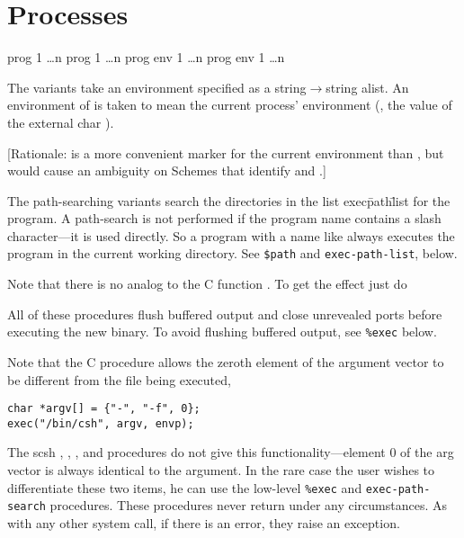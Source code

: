 \section{Processes}

 {prog 1 \ldots {}n} \noreturn
{} {prog 1 \ldots {}n} \noreturn
{}  {prog env 1 \ldots {}n} \noreturn
{} {prog env 1 \ldots {}n} \noreturn
\begin{desc}

The  variants take an environment specified as a 
string$\rightarrow$string alist.
An environment of {\sharpt} is taken to mean the current process' environment 
(\ie, the value of the external char ).

[Rationale: {\sharpf} is a more convenient marker for the current environment
 than {\sharpt}, but would cause an ambiguity on Schemes that identify 
 {\sharpf} and \ex{()}.]

The path-searching variants search the directories in the list 
{\ttt exec\=path\=list} for the program.
A path-search is not performed if the program name contains
a slash character---it is used directly. So a program with a name like
 always executes the program  in the current working
directory. See \verb|$path| and \verb|exec-path-list|, below.

Note that there is no analog to the C function .
To get the effect just do

All of these procedures flush buffered output and close unrevealed ports
before executing the new binary.  
To avoid flushing buffered output, see \verb|%exec| below.

Note that the C  procedure allows the zeroth element of the
argument vector to be different from the file being executed, \eg
%
\begin{inset}
\begin{verbatim}
char *argv[] = {"-", "-f", 0};
exec("/bin/csh", argv, envp);\end{verbatim}
\end{inset}
%
The scsh , , , and 
procedures do not give this functionality---element 0 of the arg vector is
always identical to the  argument. In the rare case the user wishes
to differentiate these two items, he can use the low-level \verb|%exec| and
\verb|exec-path-search| procedures.
These procedures never return under any circumstances.
As with any other system call, if there is an error, they raise
an exception.
\end{desc}


